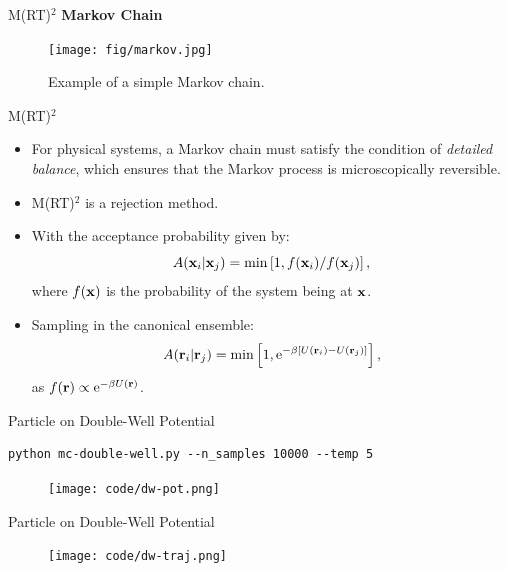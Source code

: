 \documentclass[10pt]{beamer}
\begin{document}
\begin{frame}{M(RT)$^2$}
\textbf{Markov Chain}\vspace{0.2cm}
\begin{figure}
  \texttt{[image: fig/markov.jpg]}
  \caption{Example of a simple Markov chain.}
\end{figure}
\end{frame}

\begin{frame}{M(RT)$^2$}
\begin{itemize}
\setlength\itemsep{1em}
  \item For physical systems, a Markov chain must satisfy the condition of \textit{detailed balance}, which ensures that the Markov process is microscopically reversible.

  \item M(RT)$^2$ is a rejection method.

  \item With the acceptance probability given by:
  \begin{equation}
    A({\bf x}_i | {\bf x}_j) = \min\left[1, {f({\bf x}_i)}/{f({\bf x}_j)}\right],
  \end{equation}
  where $f({\bf x})$ is the probability of the system being at ${\bf x}$.

  \item Sampling in the canonical ensemble:
  \begin{equation}
    A({\bf r}_i | {\bf r}_j) = \min\left[1, \mathrm{e}^{-\beta \left[U({\bf r}_i)-U({\bf r}_j)\right]} \right],
  \end{equation}
  as $f({\bf r}) \propto \mathrm{e}^{-\beta U({\bf r})}$.
\end{itemize}
\end{frame}

\begin{frame}[fragile]{Particle on Double-Well Potential}
\begin{lstlisting}
python mc-double-well.py --n_samples 10000 --temp 5
\end{lstlisting}
\vspace*{-0.3cm}
\begin{figure}
  \texttt{[image: code/dw-pot.png]}
\end{figure}
\end{frame}

\begin{frame}{Particle on Double-Well Potential}
\begin{figure}
  \texttt{[image: code/dw-traj.png]}
\end{figure}
\end{frame}
\end{document}
